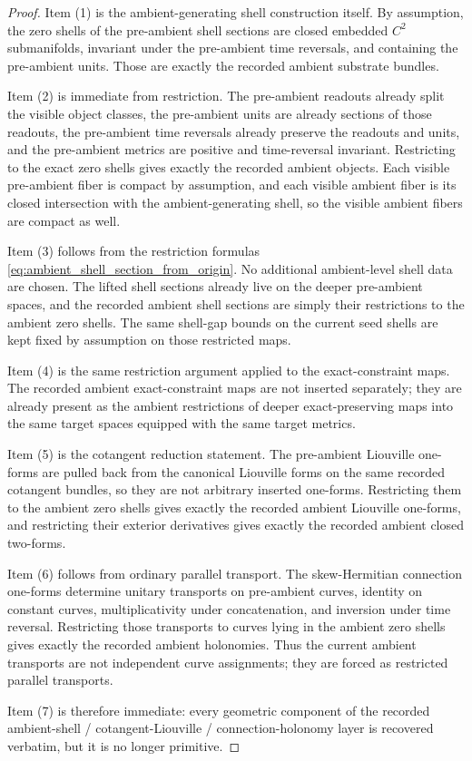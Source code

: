 \documentclass[11pt]{article}
\begin{document}
\begin{proof}
Item (1) is the ambient-generating shell construction itself. By assumption, the zero shells of the pre-ambient shell sections are closed embedded \(C^2\) submanifolds, invariant under the pre-ambient time reversals, and containing the pre-ambient units. Those are exactly the recorded ambient substrate bundles.

Item (2) is immediate from restriction. The pre-ambient readouts already split the visible object classes, the pre-ambient units are already sections of those readouts, the pre-ambient time reversals already preserve the readouts and units, and the pre-ambient metrics are positive and time-reversal invariant. Restricting to the exact zero shells gives exactly the recorded ambient objects. Each visible pre-ambient fiber is compact by assumption, and each visible ambient fiber is its closed intersection with the ambient-generating shell, so the visible ambient fibers are compact as well.

Item (3) follows from the restriction formulas \eqref{eq:ambient_shell_section_from_origin}. No additional ambient-level shell data are chosen. The lifted shell sections already live on the deeper pre-ambient spaces, and the recorded ambient shell sections are simply their restrictions to the ambient zero shells. The same shell-gap bounds on the current seed shells are kept fixed by assumption on those restricted maps.

Item (4) is the same restriction argument applied to the exact-constraint maps. The recorded ambient exact-constraint maps are not inserted separately; they are already present as the ambient restrictions of deeper exact-preserving maps into the same target spaces equipped with the same target metrics.

Item (5) is the cotangent reduction statement. The pre-ambient Liouville one-forms are pulled back from the canonical Liouville forms on the same recorded cotangent bundles, so they are not arbitrary inserted one-forms. Restricting them to the ambient zero shells gives exactly the recorded ambient Liouville one-forms, and restricting their exterior derivatives gives exactly the recorded ambient closed two-forms.

Item (6) follows from ordinary parallel transport. The skew-Hermitian connection one-forms determine unitary transports on pre-ambient curves, identity on constant curves, multiplicativity under concatenation, and inversion under time reversal. Restricting those transports to curves lying in the ambient zero shells gives exactly the recorded ambient holonomies. Thus the current ambient transports are not independent curve assignments; they are forced as restricted parallel transports.

Item (7) is therefore immediate: every geometric component of the recorded ambient-shell / cotangent-Liouville / connection-holonomy layer is recovered verbatim, but it is no longer primitive.
\end{proof}
\end{document}
